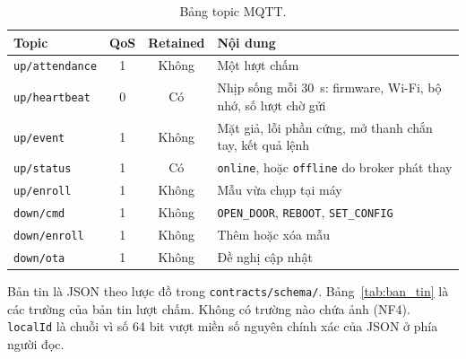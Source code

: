 \documentclass[../DoAn.tex]{subfiles}
\begin{document}
\begin{table}[!htb]
\centering
\small
\caption{Bảng topic MQTT.}
\label{tab:topic}
\begin{tabular}{|L{3.4cm}|c|c|L{7.0cm}|}
\hline
\textbf{Topic} & \textbf{QoS} & \textbf{Retained} & \textbf{Nội dung} \\
\hline
\texttt{up/attendance} & 1 & Không & Một lượt chấm \\
\hline
\texttt{up/heartbeat} & 0 & Có & Nhịp sống mỗi 30~s: firmware, Wi-Fi, bộ nhớ, số lượt chờ gửi \\
\hline
\texttt{up/event} & 1 & Không & Mặt giả, lỗi phần cứng, mở thanh chắn tay, kết quả lệnh \\
\hline
\texttt{up/status} & 1 & Có & \texttt{online}, hoặc \texttt{offline} do broker phát thay \\
\hline
\texttt{up/enroll} & 1 & Không & Mẫu vừa chụp tại máy \\
\hline
\texttt{down/cmd} & 1 & Không & \texttt{OPEN\_DOOR}, \texttt{REBOOT}, \texttt{SET\_CONFIG} \\
\hline
\texttt{down/enroll} & 1 & Không & Thêm hoặc xóa mẫu \\
\hline
\texttt{down/ota} & 1 & Không & Đề nghị cập nhật \\
\hline
\end{tabular}
\end{table}

Bản tin là JSON theo lược đồ trong \texttt{contracts/schema/}. Bảng~\ref{tab:ban_tin} là các trường
của bản tin lượt chấm. Không có trường nào chứa ảnh (NF4). \texttt{localId} là chuỗi vì số 64 bit
vượt miền số nguyên chính xác của JSON ở phía người đọc.
\end{document}
